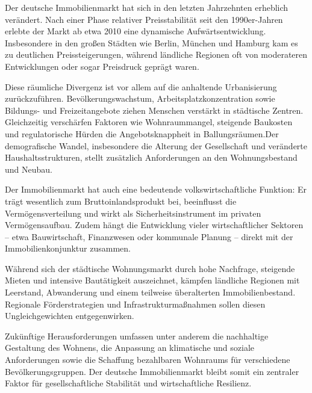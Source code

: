 Der deutsche Immobilienmarkt hat sich in den letzten Jahrzehnten erheblich verändert. Nach einer Phase relativer Preisstabilität seit den 1990er-Jahren erlebte der Markt ab etwa 2010 eine dynamische Aufwärtsentwicklung. Insbesondere in den großen Städten wie Berlin, München und Hamburg kam es zu deutlichen Preissteigerungen, während ländliche Regionen oft von moderateren Entwicklungen oder sogar Preisdruck geprägt waren.

Diese räumliche Divergenz ist vor allem auf die anhaltende Urbanisierung zurückzuführen. Bevölkerungswachstum, Arbeitsplatzkonzentration sowie Bildungs- und Freizeitangebote ziehen Menschen verstärkt in städtische Zentren. Gleichzeitig verschärfen Faktoren wie Wohnraummangel, steigende Baukosten und regulatorische Hürden die Angebotsknappheit in Ballungsräumen.Der demografische Wandel, insbesondere die Alterung der Gesellschaft und veränderte Haushaltsstrukturen, stellt zusätzlich Anforderungen an den Wohnungsbestand und Neubau.

Der Immobilienmarkt hat auch eine bedeutende volkswirtschaftliche Funktion: Er trägt wesentlich zum Bruttoinlandsprodukt bei, beeinflusst die Vermögensverteilung und wirkt als Sicherheitsinstrument im privaten Vermögensaufbau. Zudem hängt die Entwicklung vieler wirtschaftlicher Sektoren – etwa Bauwirtschaft, Finanzwesen oder kommunale Planung – direkt mit der Immobilienkonjunktur zusammen.

Während sich der städtische Wohnungsmarkt durch hohe Nachfrage, steigende Mieten und intensive Bautätigkeit auszeichnet, kämpfen ländliche Regionen mit Leerstand, Abwanderung und einem teilweise überalterten Immobilienbestand. Regionale Förderstrategien und Infrastrukturmaßnahmen sollen diesen Ungleichgewichten entgegenwirken.

Zukünftige Herausforderungen umfassen unter anderem die nachhaltige Gestaltung des Wohnens, die Anpassung an klimatische und soziale Anforderungen sowie die Schaffung bezahlbaren Wohnraums für verschiedene Bevölkerungsgruppen. Der deutsche Immobilienmarkt bleibt somit ein zentraler Faktor für gesellschaftliche Stabilität und wirtschaftliche Resilienz.
